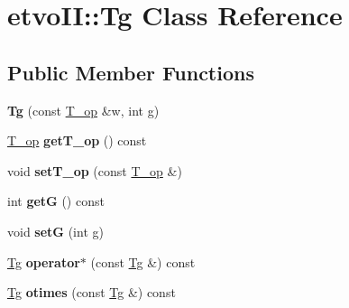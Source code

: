 \hypertarget{classetvo_i_i_1_1_tg}{}\section{etvo\+II\+:\+:Tg Class Reference}
\label{classetvo_i_i_1_1_tg}
\subsection*{Public Member Functions}
\begin{DoxyCompactItemize}
\item 
\mbox{\label{classetvo_i_i_1_1_tg_a7c22ad366c60473b04d047ea72aef1a3}} 
{\bfseries Tg} (const \mbox{\hyperlink{classetvo_i_i_1_1_t__op}{T\+\_\+op}} \&w, int g)
\item 
\mbox{\label{classetvo_i_i_1_1_tg_abbaa3363e1b3e36fea69c453a49cda16}} 
\mbox{\hyperlink{classetvo_i_i_1_1_t__op}{T\+\_\+op}} {\bfseries get\+T\+\_\+op} () const
\item 
\mbox{\label{classetvo_i_i_1_1_tg_a0e5e15d4b4e212fd0f92ae736c23b506}} 
void {\bfseries set\+T\+\_\+op} (const \mbox{\hyperlink{classetvo_i_i_1_1_t__op}{T\+\_\+op}} \&)
\item 
\mbox{\label{classetvo_i_i_1_1_tg_a7e09570d64bb434120a289467ec8c39a}} 
int {\bfseries getG} () const
\item 
\mbox{\label{classetvo_i_i_1_1_tg_a5d7b9b764fe2e988f5d0a5d01e3cb6d4}} 
void {\bfseries setG} (int g)
\item 
\mbox{\label{classetvo_i_i_1_1_tg_ae112af73378e9e2ff35163edc1cd4424}} 
\mbox{\hyperlink{classetvo_i_i_1_1_tg}{Tg}} {\bfseries operator$\ast$} (const \mbox{\hyperlink{classetvo_i_i_1_1_tg}{Tg}} \&) const
\item 
\mbox{\label{classetvo_i_i_1_1_tg_a282937d4866705b25ad1ce3cc8c078da}} 
\mbox{\hyperlink{classetvo_i_i_1_1_tg}{Tg}} {\bfseries otimes} (const \mbox{\hyperlink{classetvo_i_i_1_1_tg}{Tg}} \&) const
\item 
\mbox{\label{classetvo_i_i_1_1_tg_a0b6c73ff388a76673412639c89e942a8}} 

\end{DoxyCompactItemize}
